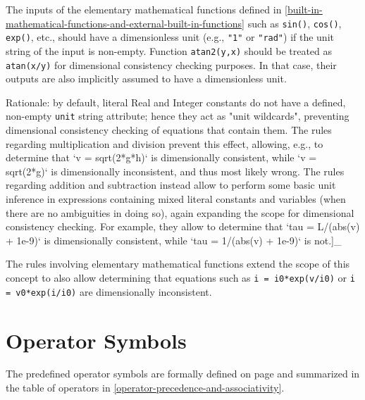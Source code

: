 The inputs of the elementary mathematical functions defined in \cref{built-in-mathematical-functions-and-external-built-in-functions} such as \lstinline!sin()!, \lstinline!cos()!, \lstinline!exp()!, etc., should have a dimensionless unit (e.g., \lstinline!"1"! or \lstinline!"rad"!) if the unit string of the input is non-empty. Function \lstinline!atan2(y,x)! should be treated as  \lstinline!atan(x/y)! for dimensional consistency checking purposes.
In that case, their outputs are also implicitly assumed to have a dimensionless unit.

\begin{nonnormative}
Rationale: by default, literal Real and Integer constants do not have a defined, non-empty \lstinline!unit! string attribute; hence they act as "unit wildcards", preventing dimensional consistency checking of equations that contain them. The rules regarding multiplication and division prevent this effect, allowing, e.g., to determine that `v = sqrt(2*g*h)` is dimensionally consistent, while `v = sqrt(2*g)` is dimensionally inconsistent, and thus most likely wrong. The rules regarding addition and subtraction instead allow to perform some basic unit inference in expressions containing mixed literal constants and variables (when there are no ambiguities in doing so), again expanding the scope for dimensional consistency checking. For example, they allow to determine that `tau = L/(abs(v) + 1e-9)` is dimensionally consistent, while `tau = 1/(abs(v) + 1e-9)` is not.]_


The rules involving elementary mathematical functions extend the scope of this concept to also allow determining that equations such as \lstinline!i = i0*exp(v/i0)! or \lstinline!i = v0*exp(i/i0)! are dimensionally inconsistent.
\end{nonnormative}

\section{Operator Symbols}\label{operator-symbols}

The predefined operator symbols are formally defined on page \pageref{lexical-conventions} and
summarized in the table of operators in \cref{operator-precedence-and-associativity}.
